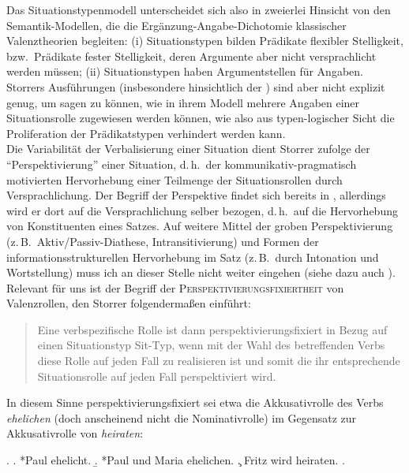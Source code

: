 {Das Situationstypenmodell unterscheidet sich also in zweierlei Hinsicht von den Semantik-Modellen, die die Ergänzung-Angabe-Dichotomie klassischer Valenztheorien begleiten: (i) Situationstypen bilden Prädikate flexibler Stelligkeit, bzw.\ Prädikate fester Stelligkeit, deren Argumente aber nicht versprachlicht werden müssen; (ii) Situationstypen haben Argumentstellen für Angaben. Storrers Ausführungen (insbesondere hinsichtlich der ) sind aber nicht explizit genug, um sagen zu können, wie in ihrem Modell mehrere Angaben einer Situationsrolle zugewiesen werden können, wie also aus typen-logischer Sicht die Proliferation der Prädikatstypen verhindert werden kann.  \\

Die Variabilität der Verbalisierung einer Situation dient Storrer zufolge der "`Perspektivierung"' einer Situation, d.\,h.\ der kommunikativ-pragmatisch motivierten Hervorhebung einer Teilmenge der Situationsrollen durch Versprachlichung. Der Begriff der Perspektive findet sich bereits in \cite{Fillmore:77,Fillmore:77b}, allerdings wird er dort auf die Versprachlichung selber bezogen, d.\,h.\ auf die Hervorhebung von Konstituenten eines Satzes. Auf weitere Mittel der groben Perspektivierung (z.\,B.\ Aktiv/Passiv-Diathese, Intransitivierung) und Formen der informationsstrukturellen Hervorhebung im Satz (z.\,B.\ durch Intonation und Wortstellung) muss ich an dieser Stelle nicht weiter eingehen (siehe dazu auch \citealt[Kapitel~5]{Duerscheid:99}). Relevant für uns ist der Begriff der \textsc{Perspektivierungsfixiertheit} von Valenzrollen, den Storrer folgenderma\ss en einführt:

\begin{quote}
Eine verbspezifische Rolle ist dann perspektivierungsfixiert in Bezug auf einen Situationstyp Sit-Typ, wenn mit der Wahl des betreffenden Verbs diese Rolle auf jeden Fall zu realisieren ist und somit die ihr entsprechende Situationsrolle auf jeden Fall perspektiviert wird. \citep[285]{Storrer:92}
\end{quote}   
In diesem Sinne perspektivierungsfixiert sei etwa die Akkusativrolle des Verbs {\it ehelichen} (doch anscheinend nicht die Nominativrolle) im Gegensatz zur Akkusativrolle von {\it heiraten}:

\ex. \label{ex-storrer-285}
\a. \label{ex-storrer-285-a} *Paul ehelicht.
\b. \label{ex-storrer-285-b} *Paul und Maria ehelichen.
\c. Fritz wird heiraten.
\z. \citep[285]{Storrer:92}

}
